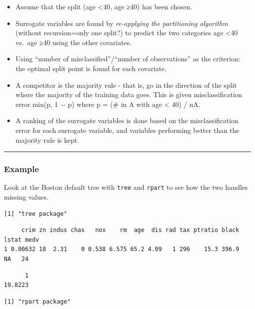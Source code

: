 \documentclass[
  letterpaper,
  DIV=11,
  numbers=noendperiod]{scrartcl}
\providecommand{\tightlist}{%
  \setlength{\itemsep}{0pt}\setlength{\parskip}{0pt}}\usepackage{longtable,booktabs,array}
\begin{document}
\begin{itemize}
\tightlist
\item
  Assume that the split (age \textless40, age ≥40) has been chosen.
\item
  Surrogate variables are found by \emph{re-applying the partitioning
  algorithm} (without recursion=only one split?) to predict the two
  categories age \textless40 vs.~age ≥40 using the other covariates.
\item
  Using ``number of misclassified''/``number of observations'' as the
  criterion: the optimal split point is found for each covariate.
\item
  A competitor is the majority rule - that is, go in the direction of
  the split where the majority of the training data goes. This is given
  misclassification error min(p, 1 − p) where p = (\# in A with age
  \textless{} 40) / nA.
\item
  A ranking of the surrogate variables is done based on the
  misclassification error for each surrogate variable, and variables
  performing better than the majority rule is kept.
\end{itemize}

\begin{center}\rule{0.5\linewidth}{0.5pt}\end{center}

\hypertarget{example}{%
\subsubsection{Example}\label{example}}

Look at the Boston default tree with \texttt{tree} and \texttt{rpart} to
see how the two handles missing values.

\begin{verbatim}
[1] "tree package"
\end{verbatim}

\begin{verbatim}
     crim zn indus chas   nox    rm  age  dis rad tax ptratio black lstat medv
1 0.00632 18  2.31    0 0.538 6.575 65.2 4.09   1 296    15.3 396.9    NA   24
\end{verbatim}

\begin{verbatim}
      1 
19.8223 
\end{verbatim}

\begin{verbatim}
[1] "rpart package"
\end{verbatim}
\end{document}
